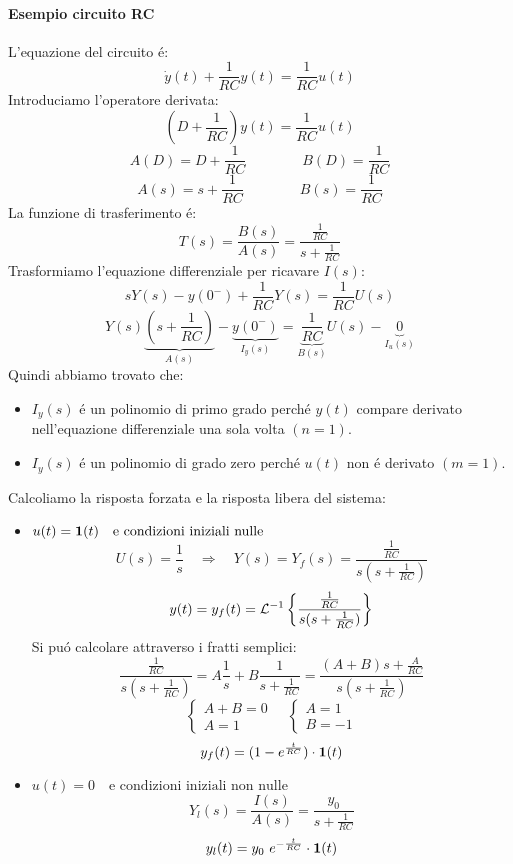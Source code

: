 \documentclass[../main.tex]{subfiles}
\begin{document}
		\begin{mdframed}[style=Esempio]
			\paragraph{Esempio circuito RC}
			L'equazione del circuito \'{e}:
			\[ 
				\dot{y}(t) + \frac{1}{RC} y(t) = \frac{1}{RC} u(t)
			\]
			Introduciamo l'operatore derivata:
			\[ 
				(D + \frac{1}{RC}) y(t) = \frac{1}{RC} u(t)
			\]
			\[ 
				A(D) = D + \frac{1}{RC} \qquad \qquad B(D) = \frac{1}{RC}
			\]
			\[ 
				A(s) = s + \frac{1}{RC} \qquad \qquad B(s) = \frac{1}{RC}
			\]
			La funzione di trasferimento \'{e}:
			\[
				T(s) = \frac{B(s)}{A(s)} = \frac{\frac{1}{RC}}{s+\frac{1}{RC}}
			\]
			Trasformiamo l'equazione differenziale per ricavare $ I(s) $:
			\[
				s Y(s) - y(0^-) + \frac{1}{RC} Y(s) = \frac{1}{RC} U(s)
			\]
			\[
				Y(s) \underbrace{ \left( s + \frac{1}{RC} \right) }_{A(s)} - \underbrace{y(0^-)}_{I_y(s)} = \underbrace{\frac{1}{RC}}_{B(s)} U(s) - \underbrace{0}_{I_u(s)}
			\]
			Quindi abbiamo trovato che:
			\begin{itemize}
				\item 
					$ I_y(s) $ \'e un polinomio di primo grado perch\'e $ y(t) $ compare derivato nell'equazione differenziale una sola volta $ (n = 1) $.
				\item
					$ I_y(s) $ \'e un polinomio di grado zero perch\'e $ u(t) $ non \'e derivato $ (m = 1) $. 
			\end{itemize}
			\noindent
			Calcoliamo la risposta forzata e la risposta libera del sistema:
			\begin{itemize}
				\item 
					$ u(t) = \textbf{1}(t) \quad \text{e condizioni iniziali nulle} $
					\[
						U(s) = \frac{1}{s} \quad \Rightarrow \quad Y(s) = Y_f(s) = \frac{\frac{1}{RC}}{s(s+\frac{1}{RC})}
					\]
					\[
						y(t) = y_f(t) = \mathcal{L}^{-1} \left\lbrace \frac{\frac{1}{RC}}{s(s+\frac{1}{RC})} \right\rbrace
					\]
					Si pu\'{o} calcolare attraverso i fratti semplici:
					\[
						\frac{\frac{1}{RC}}{s(s+\frac{1}{RC})} = A\frac{1}{s} + B\frac{1}{s+\frac{1}{RC}} = \frac{(A+B)s+\frac{A}{RC}}{s(s+\frac{1}{RC})}
					\]
					\[
						\begin{cases}
							A+B=0\\
							A=1
						\end{cases} \quad 
						\begin{cases} 
							A=1\\
							B=-1
						\end{cases}
					\]
					\[
						y_f(t) = (1-e^{\frac{t}{RC}}) \cdot \textbf{1}(t)
					\]
				\item 
					$ u(t) = 0 \quad \text{e condizioni iniziali non nulle} $
					\[ 
						Y_l(s) = \frac{I(s)}{A(s)} = \frac{y_0}{s+\frac{1}{RC}} 
					\]
					\[
						y_l(t) = y_0\ e^{-\frac{t}{RC}} \cdot \textbf{1}(t)
					\]
			\end{itemize}
		

\end{mdframed}
\end{document}
